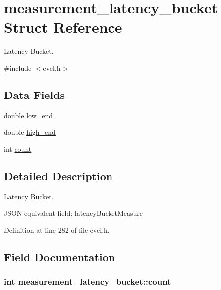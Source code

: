 \hypertarget{structmeasurement__latency__bucket}{}\section{measurement\+\_\+latency\+\_\+bucket Struct Reference}
\label{structmeasurement__latency__bucket}


Latency Bucket.  




{\ttfamily \#include $<$evel.\+h$>$}

\subsection*{Data Fields}
\begin{DoxyCompactItemize}
\item 
double \hyperlink{structmeasurement__latency__bucket_ac8d430db34586faa9738b34fb3820a20}{low\+\_\+end}
\item 
double \hyperlink{structmeasurement__latency__bucket_a756a7061a0ef701d06919a42ceca18e0}{high\+\_\+end}
\item 
int \hyperlink{structmeasurement__latency__bucket_a5957e2d644bce4e4403ce381aca6bc93}{count}
\end{DoxyCompactItemize}


\subsection{Detailed Description}
Latency Bucket. 

J\+S\+O\+N equivalent field\+: latency\+Bucket\+Measure 

Definition at line 282 of file evel.\+h.



\subsection{Field Documentation}
\hypertarget{structmeasurement__latency__bucket_a5957e2d644bce4e4403ce381aca6bc93}{}
\subsubsection[{count}]{\setlength{\rightskip}{0pt plus 5cm}int measurement\+\_\+latency\+\_\+bucket\+::count}\label{structmeasurement__latency__bucket_a5957e2d644bce4e4403ce381aca6bc93}


